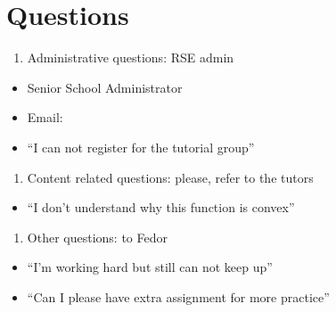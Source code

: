 \documentclass[letterpaper,10pt,english]{jupyterBook}
\begin{document}
\section{Questions}
\label{\detokenize{00.intro:questions}}\begin{enumerate}
%
\item {} 
\sphinxAtStartPar
Administrative questions: RSE admin

\end{enumerate}
\begin{itemize}
\item {} 
\sphinxAtStartPar
{} Senior School Administrator

\item {} 
\sphinxAtStartPar
Email: 

\item {} 
\sphinxAtStartPar
“I can not register for the tutorial group”

\end{itemize}
\begin{enumerate}
%
\setcounter{enumi}{1}
\item {} 
\sphinxAtStartPar
Content related questions: please, refer to the tutors

\end{enumerate}
\begin{itemize}
\item {} 
\sphinxAtStartPar
“I don’t understand why this function is convex”

\end{itemize}
\begin{enumerate}
%
\setcounter{enumi}{2}
\item {} 
\sphinxAtStartPar
Other questions: to Fedor

\end{enumerate}
\begin{itemize}
\item {} 
\sphinxAtStartPar
“I’m working hard but still can not keep up”

\item {} 
\sphinxAtStartPar
“Can I please have extra assignment for more practice”

\end{itemize}
\end{document}
